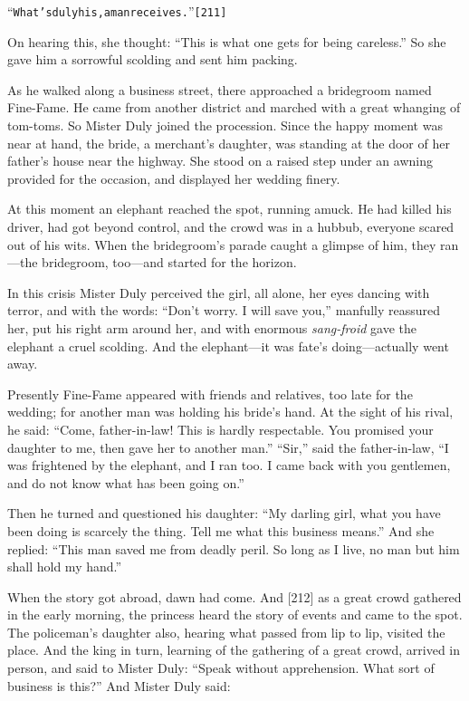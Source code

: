 \documentclass{article}
\renewenvironment{verbatim}{\begin{alltt}\normalfont\begin{centering}}{\end{centering}\end{alltt}}
\begin{document}
\begin{verbatim}
“What's duly his, a man receives.”                      [211]
\end{verbatim}
On hearing this, she thought:
``This is what one gets for being careless.'' So she gave him a
sorrowful scolding and sent him packing.

As he walked along a business street, there approached a bridegroom
named Fine-Fame. He came from another district and marched with a
great whanging of tom-toms. So Mister Duly joined the procession.
Since the happy moment was near at hand, the bride, a merchant's
daughter, was standing at the door of her father's house near the
highway. She stood on a raised step under an awning provided for
the occasion, and displayed her wedding finery.

At this moment an elephant reached the spot, running amuck. He had
killed his driver, had got beyond control, and the crowd was in a
hubbub, everyone scared out of his wits. When the bridegroom's
parade caught a glimpse of him, they ran---the bridegroom,
too---and started for the horizon.

In this crisis Mister Duly perceived the girl, all alone, her eyes
dancing with terror, and with the words:
``Don't worry. I will save you,'' manfully reassured her, put his
right arm around her, and with enormous \emph{sang-froid} gave the
elephant a cruel scolding. And the elephant---it was fate's
doing---actually went away.

Presently Fine-Fame appeared with friends and relatives, too late
for the wedding; for another man was holding his bride's hand. At
the sight of his rival, he said:
``Come, father-in-law! This is hardly respectable. You promised your daughter to me, then gave her to another man.''
``Sir,'' said the father-in-law,
``I was frightened by the elephant, and I ran too. I came back with you gentlemen, and do not know what has been going on.''

Then he turned and questioned his daughter:
``My darling girl, what you have been doing is scarcely the thing. Tell me what this business means.''
And she replied:
``This man saved me from deadly peril. So long as I live, no man but him shall hold my hand.''

When the story got abroad, dawn had come. And [212] as a great
crowd gathered in the early morning, the princess heard the story
of events and came to the spot. The policeman's daughter also,
hearing what passed from lip to lip, visited the place. And the
king in turn, learning of the gathering of a great crowd, arrived
in person, and said to Mister Duly:
``Speak without apprehension. What sort of business is this?'' And
Mister Duly said:
\end{document}
